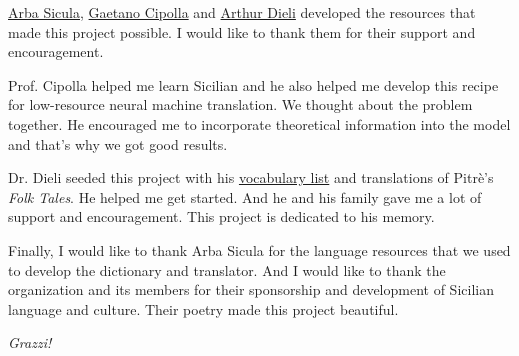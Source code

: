 \documentclass[10pt,letterpaper]{article}
\begin{document}
\href{https://www.arbasicula.org/}{Arba Sicula},
\href{https://en.wikipedia.org/wiki/Gaetano_Cipolla}{Gaetano Cipolla} and
\href{http://www.dieli.net/}{Arthur Dieli}
developed the resources that made this project possible.
I would like to thank them for their support and encouragement.

Prof. Cipolla helped me learn Sicilian and he also helped me develop this recipe for
low-resource neural machine translation.  We thought about the problem together.
He encouraged me to incorporate theoretical information into the model and that's
why we got good results.

Dr. Dieli seeded this project with his
\href{http://www.dieli.net/SicilyPage/SicilianLanguage/Vocabulary.html}{vocabulary list}
and translations of Pitrè's \textit{Folk Tales}.  He helped me get started.
And he and his family gave me a lot of support and encouragement.
This project is dedicated to his memory.

Finally, I would like to thank Arba Sicula for the language resources that we used to develop
the dictionary and translator.  And I would like to thank the organization and its members
for their sponsorship and development of Sicilian language and culture.
Their poetry made this project beautiful.

\textit{Grazzi!}



\hypertarget{bibliography}{}




\end{document}
